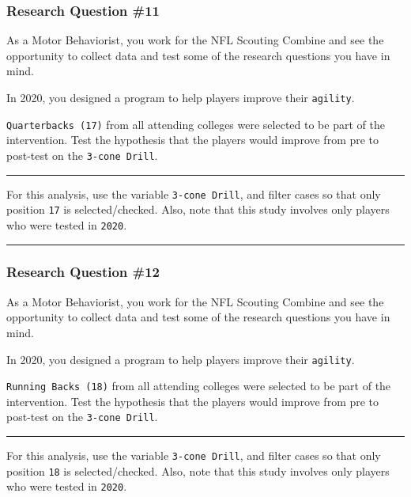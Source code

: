\documentclass[
]{article}
\begin{document}
\hypertarget{research-question-11}{%
\subsubsection{Research Question \#11}\label{research-question-11}}

As a Motor Behaviorist, you work for the NFL Scouting Combine and see the opportunity to collect data and test some of the research questions you have in mind.

In 2020, you designed a program to help players improve their \texttt{agility}.

\texttt{Quarterbacks\ (17)} from all attending colleges were selected to be part of the intervention. Test the hypothesis that the players would improve from pre to post-test on the \texttt{3-cone\ Drill}.

\begin{center}\rule{0.5\linewidth}{0.5pt}\end{center}

For this analysis, use the variable \texttt{3-cone\ Drill}, and filter cases so that only position \texttt{17} is selected/checked. Also, note that this study involves only players who were tested in \texttt{2020}.

\begin{center}\rule{0.5\linewidth}{0.5pt}\end{center}

\hypertarget{research-question-12}{%
\subsubsection{Research Question \#12}\label{research-question-12}}

As a Motor Behaviorist, you work for the NFL Scouting Combine and see the opportunity to collect data and test some of the research questions you have in mind.

In 2020, you designed a program to help players improve their \texttt{agility}.

\texttt{Running\ Backs\ (18)} from all attending colleges were selected to be part of the intervention. Test the hypothesis that the players would improve from pre to post-test on the \texttt{3-cone\ Drill}.

\begin{center}\rule{0.5\linewidth}{0.5pt}\end{center}

For this analysis, use the variable \texttt{3-cone\ Drill}, and filter cases so that only position \texttt{18} is selected/checked. Also, note that this study involves only players who were tested in \texttt{2020}.
\end{document}
